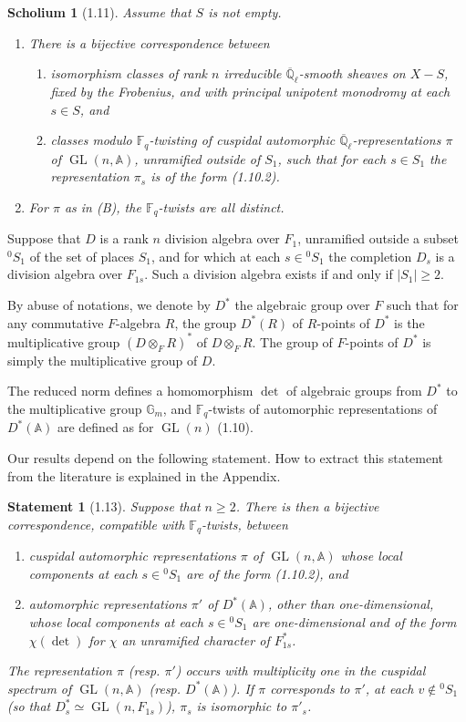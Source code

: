 \documentclass[10pt]{article}
\newcommand{\Fq}{\mathbb F_q}
\newcommand{\Ql}{\overline{\mathbb Q}_{\ell}}
\newcommand{\Adele}{\mathbb A}
\newcommand{\Gm}{\mathbb G_m}
\newcommand{\GL}{\operatorname{GL}}
\newcommand{\detm}{\operatorname{det}}
\theoremstyle{deligne}
\newtheorem*{statement*}{Statement}
\newtheorem*{scholium*}{Scholium}
\newcommand{\heading}[1]{\vspace{0.7em}\noindent{\bfseries #1}\quad}
\begin{document}
\begin{scholium*}[1.11]
Assume that $S$ is not empty.
\begin{enumerate}[label=(\roman*)]
\item There is a bijective correspondence between
\begin{enumerate}[label=(\Alph*)]
\item isomorphism classes of rank $n$ irreducible $\Ql$-smooth sheaves on $X-S$, fixed by the Frobenius, and with principal unipotent monodromy at each $s\in S$, and
\item classes modulo $\Fq$-twisting of cuspidal automorphic $\Ql$-representations $\pi$ of $\GL(n,\Adele)$, unramified outside of $S_1$, such that for each $s\in S_1$ the representation $\pi_s$ is of the form (1.10.2).
\end{enumerate}
\item For $\pi$ as in (B), the $\Fq$-twists are all distinct.
\end{enumerate}
\end{scholium*}

\heading{1.12.} Suppose that $D$ is a rank $n$ division algebra over $F_1$, unramified outside a subset ${}^0S_1$ of the set of places $S_1$, and for which at each $s\in{}^0S_1$ the completion $D_s$ is a division algebra over $F_{1s}$. Such a division algebra exists if and only if $|S_1|\ge2$.

By abuse of notations, we denote by $D^*$ the algebraic group over $F$ such that for any commutative $F$-algebra $R$, the group $D^*(R)$ of $R$-points of $D^*$ is the multiplicative group $(D\otimes_F R)^*$ of $D\otimes_F R$. The group of $F$-points of $D^*$ is simply the multiplicative group of $D$.

The reduced norm defines a homomorphism $\detm$ of algebraic groups from $D^*$ to the multiplicative group $\Gm$, and $\Fq$-twists of automorphic representations of $D^*(\Adele)$ are defined as for $\GL(n)$ (1.10).

Our results depend on the following statement. How to extract this statement from the literature is explained in the Appendix.

\begin{statement*}[1.13]
Suppose that $n\ge2$. There is then a bijective correspondence, compatible with $\Fq$-twists, between
\begin{enumerate}[label=(\Alph*)]
\item cuspidal automorphic representations $\pi$ of $\GL(n,\Adele)$ whose local components at each $s\in{}^0S_1$ are of the form (1.10.2), and
\item automorphic representations $\pi'$ of $D^*(\Adele)$, other than one-dimensional, whose local components at each $s\in{}^0S_1$ are one-dimensional and of the form $\chi(\detm)$ for $\chi$ an unramified character of $F^*_{1s}$.
\end{enumerate}
The representation $\pi$ (resp. $\pi'$) occurs with multiplicity one in the cuspidal spectrum of $\GL(n,\Adele)$ (resp. $D^*(\Adele)$). If $\pi$ corresponds to $\pi'$, at each $v\notin{}^0S_1$ (so that $D^*_s\simeq\GL(n,F_{1s})$), $\pi_s$ is isomorphic to $\pi'_s$.
\end{statement*}
\end{document}
